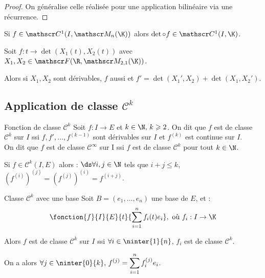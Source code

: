 \begin{proof}
    On généralise celle réalisée pour une application bilinéaire via une récurrence.
\end{proof}

\begin{corollaire}{}{}
    Si $f \in \mathscr C^1(I, \mathscr M_n(\K))$ alors $\det \circ f \in \mathscr C^1(I, \K)$.
\end{corollaire}

\begin{exemple}
    Soit $f: t \to \det(X_1(t), X_2(t))$ avec $X_1, X_2 \in \mathscr F(\R, \mathscr M_{2, 1}(\K))$. 

    Alors si $X_1, X_2$ sont dérivables, $f$ aussi et 
    $f' = \det(X_1', X_2) + \det(X_1, X_2')$.
\end{exemple}

\subsection{Application de classe \texorpdfstring{$\mathscr C^k$}{Ck}}

\begin{definition}{Fonction de classe $\mathscr C^k$}{}
    Soit $f : I \to E$ et $k \in \N, \, k \geqslant 2$. On dit que $f$ est de classe 
    $\mathscr C^k$ sur $I$ ssi $f, f', \ldots, f^{(k-1)}$ sont dérivables sur $I$ et $f^{(k)}$ est continue sur $I$. \\

    On dit que $f$ est de classe $\mathscr C^\infty$ sur I ssi $f$ est de classe 
    $\mathscr C^k$ pour tout $k \in \N$.
\end{definition}

\begin{remarque}
    Si $f \in \mathscr C^k(I,E)$ alors :
    $\ds \forall i,j \in \N$ tels que $i + j \leqslant k$,
    $\left(f^{(i)}\right)^{(j)} = \left(f^{(j)}\right)^{(i)} = f^{(i+j)}$.
\end{remarque}

\begin{proposition}{Classe $\mathscr C^k$ avec une base}{}
    Soit $B = (e_1, \ldots, e_n)$ une base de $E$, et :
    \[\fonction{f}{I}{E}{t}{\sum_{i=1}^n f_i(t)e_i},~\text{où}~f_i : I \to \K\]

    Alors $f$ est de classe $\mathscr C^k$ sur $I$ ssi $\forall i \in \ninter{1}{n}$, $f_i$ est de classe $\mathscr C^k$. 

    On a alors $\displaystyle \forall j \in \ninter{0}{k}, \, f^{(j)} = \sum_{i=1}^n f_i^{(j)}e_i$.
\end{proposition}

